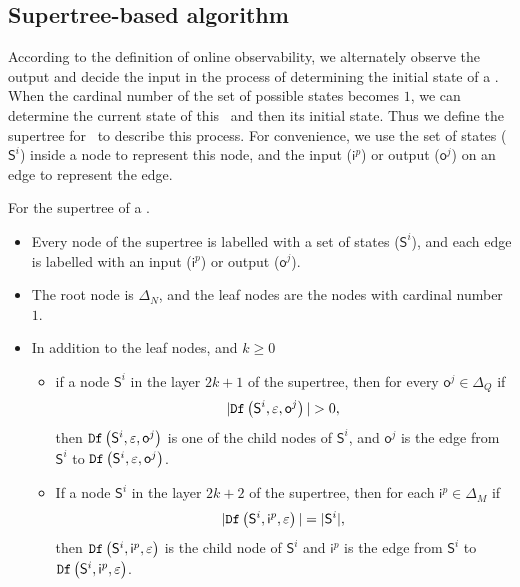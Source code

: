 \subsection{Supertree-based algorithm} %
According to the definition of online observability, we alternately observe the output and decide the input in the process of determining the initial state of a \BCN. When the cardinal number of the set of possible states becomes $1$, we can determine the current state of this \BCN\ and then its initial state. Thus we define the supertree for \BCNs\ to describe this process. For convenience, we use the set of states ($\mathsf{S}^i$) inside a node to represent this node, and the input ($\mathsf{i}^p$) or output ($\mathsf{o}^j$) on an edge to represent the edge.
\begin{definition}[Supertree]
For the supertree of a \BCN.   
\begin{itemize}
 \item  Every node of the supertree is labelled with a set of states ($\mathsf{S}^i$), and each edge is labelled with an input ($\mathsf{i}^p$) or output ($\mathsf{o}^j$).
 \item  The root node is $\Delta_N$, and the leaf nodes are the nodes with cardinal number $1$.%
 \item In addition to the leaf nodes, and $k\ge0$
 \begin{itemize}
 \item if a node $\mathsf{S}^i$ in the layer $2k + 1$ of the supertree, then for every $\mathsf{o}^j\in \Delta_Q$ if
\[|\Ded\left(\mathsf{S}^i,\varepsilon, \mathsf{o}^j\right)|>0,\]
 then ${\tt Df}\left(\mathsf{S}^i,\varepsilon, \mathsf{o}^j\right)$ is one of the child nodes of $\mathsf{S}^i$, and $\mathsf{o}^j$ is the edge from $\mathsf{S}^i$ to ${\tt Df}\left(\mathsf{S}^i,\varepsilon, \mathsf{o}^j\right)$.
 \item If a node $\mathsf{S}^i$ in the layer $2k+2$ of the supertree, then for each $\mathsf{i}^p \in \Delta_M$ if
\[|{\tt Df}\left(\mathsf{S}^i,\mathsf{i}^p,\varepsilon\right)|=|\mathsf{S}^i|,\] 
then ${\tt Df}\left(\mathsf{S}^i,\mathsf{i}^p,\varepsilon\right)$ is the child node of $\mathsf{S}^i$ and $\mathsf{i}^p$ is the edge from $\mathsf{S}^i$ to ${\tt Df}\left(\mathsf{S}^i,\mathsf{i}^p,\varepsilon\right)$. 
 \end{itemize}
 
  
 \end{itemize}
\label{def:super-tree}
\end{definition}

